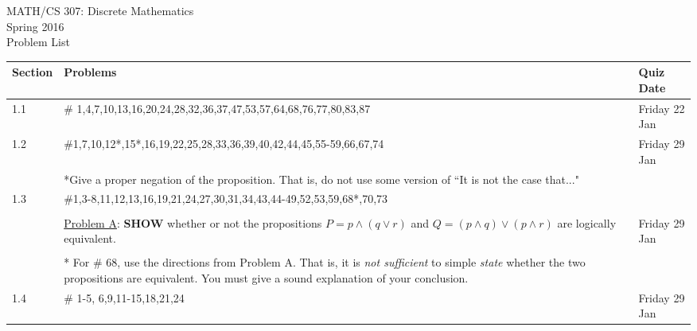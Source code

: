 \documentclass[11pt]{article}
\begin{document}
\begin{center}MATH/CS 307:  Discrete Mathematics \\ Spring 2016 \\ Problem List\end{center}

\hrulefill

\begin{tabular}{|p{1.6cm}|p{12cm}|p{3cm}|}
\hline
Section & Problems & Quiz Date\\
\hline \hline
1.1 & \# 1,4,7,10,13,16,20,24,28,32,36,37,47,53,57,64,68,76,77,80,83,87& Friday 22 Jan \\
\hline
1.2 & \#1,7,10,12*,15*,16,19,22,25,28,33,36,39,40,42,44,45,55-59,66,67,74 & Friday 29 Jan \\
&*Give a proper negation of the proposition. That is, do not use some version of ``It is not the case that..."&\\
\hline
1.3 & \#1,3-8,11,12,13,16,19,21,24,27,30,31,34,43,44-49,52,53,59,68*,70,73&\\
&&\\
& \underline{Problem A}: \textbf{SHOW} whether or not the propositions $P=p \wedge(q\vee r)$ and $Q=(p \wedge q) \vee (p \wedge r)$ are logically equivalent.&Friday 29 Jan\\
&&\\
& * For \# 68, use the directions from Problem A. That is, it is \emph{not sufficient} to simple \emph{state} whether the two propositions are equivalent. You must give a sound explanation of your conclusion.&\\
\hline
1.4 & \# 1-5, 6,9,11-15,18,21,24& Friday 29 Jan\\
\hline
\end{tabular}
\end{document}
